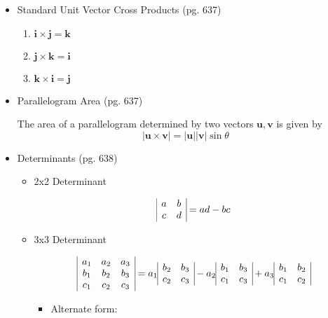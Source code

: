 \documentclass[12pt]{article}
\theoremstyle{plain}
\theoremstyle{definition}
\theoremstyle{remark}
\newcommand{\vect}[1]{\mathbf{#1}}
\newcommand{\veci}{\mathbf{i}}
\newcommand{\vecj}{\mathbf{j}}
\newcommand{\veck}{\mathbf{k}}
\begin{document}
\begin{itemize}
		\newpage			
		\item Standard Unit Vector Cross Products (pg. 637)
			\begin{enumerate}
			\item $\veci \times \vecj = \veck$
			\item $\vecj \times \veck = \veci$
			\item $\veck \times \veci = \vecj$
			\end{enumerate}
		\item Parallelogram Area (pg. 637)
		
		The area of a parallelogram determined by two vectors $\vect{u},\vect{v}$ is given by \[|\vect{u} \times \vect{v}| = |\vect{u}||\vect{v}|\sin \theta\]
		
		\item Determinants (pg. 638)
			\begin{itemize}
			\item 2x2 Determinant
			
			\[
\begin{array}{|c c|}
a & b \\
c & d \\
\end{array}
			= ad - bc
			\]
			
			\item 3x3 Determinant
			
			\[
\begin{array}{|c c c|}
a_1 & a_2 & a_3 \\
b_1 & b_2 & b_3 \\
c_1 & c_2 & c_3 \\
\end{array}
			= a_1
\begin{array}{|c c|}
b_2 & b_3 \\
c_2 & c_3 \\
\end{array}
			- a_2
\begin{array}{|c c|}
b_1 & b_3 \\
c_1 & c_3 \\
\end{array}
			+ a_3
\begin{array}{|c c|}
b_1 & b_2 \\
c_1 & c_2 \\
\end{array}
			\]
			
			\begin{itemize}
				\item Alternate form:
			

\end{itemize}
\end{itemize}
\end{itemize}
\end{document}
